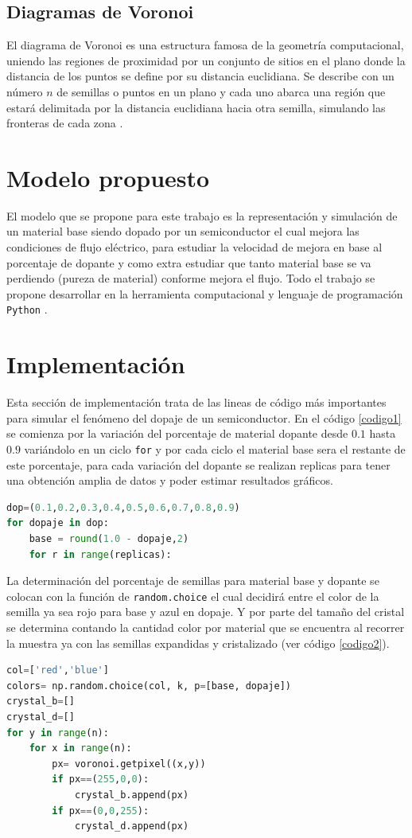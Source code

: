 \documentclass[9pt,twocolumn,twoside]{osajnl}
\begin{document}
\subsection{Diagramas de Voronoi}
El diagrama de Voronoi es una estructura famosa de la geometría 
computacional, uniendo las regiones de proximidad por un conjunto de sitios en el plano donde la distancia de los puntos se define por su distancia euclidiana. Se describe con un número $n$ de semillas o puntos en un plano y cada uno abarca una región que estará delimitada por la distancia euclidiana hacia otra semilla, simulando las fronteras de cada zona \cite{voronoi_def}.

\section{Modelo propuesto}
El modelo que se propone para este trabajo es la representación y simulación de un material base siendo dopado por un semiconductor el cual mejora las condiciones de flujo eléctrico, para estudiar la velocidad de mejora en base al porcentaje de dopante y como extra estudiar que tanto material base se va perdiendo (pureza de material) conforme mejora el flujo. Todo el trabajo se propone desarrollar en la herramienta computacional y lenguaje de programación \texttt{Python} \cite{Python}.

\section{Implementación}
Esta sección de implementación trata de las lineas de código más importantes para simular el fenómeno del dopaje de un semiconductor.
En el código \ref{codigo1} se comienza por la variación del porcentaje de material dopante desde $0.1$ hasta $0.9$ variándolo en un ciclo \texttt{for} y por cada ciclo el material base sera el restante de este porcentaje, para cada variación del dopante se realizan replicas para tener una obtención amplia de datos y poder estimar resultados gráficos.
\begin{lstlisting}[language=Python,caption=Porcentajes de dopaje.,label=codigo1] 
dop=(0.1,0.2,0.3,0.4,0.5,0.6,0.7,0.8,0.9)
for dopaje in dop:
    base = round(1.0 - dopaje,2)
    for r in range(replicas):
\end{lstlisting}

La determinación del porcentaje de semillas para material base y dopante se colocan con la función de \texttt{random.choice} el cual decidirá entre el color de la semilla ya sea rojo para base y azul en dopaje.
Y por parte del tamaño del cristal se determina contando la cantidad color por material que se encuentra al recorrer la muestra ya con las semillas expandidas y cristalizado (ver código \ref{codigo2}).
\begin{lstlisting}[language=Python,caption=Colocación de dopaje y tamaño de cristal.,label=codigo2] 
col=['red','blue']
colors= np.random.choice(col, k, p=[base, dopaje]) 
crystal_b=[]
crystal_d=[]
for y in range(n):
    for x in range(n):
        px= voronoi.getpixel((x,y))
        if px==(255,0,0):
            crystal_b.append(px)
        if px==(0,0,255):
            crystal_d.append(px)
\end{lstlisting}
\end{document}
